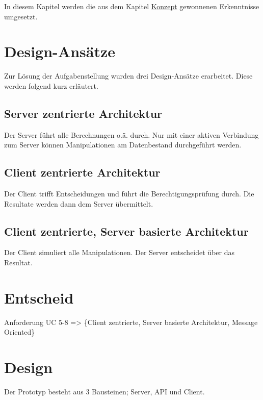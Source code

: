 \documentclass[oneside,11pt,parskip=half,ngerman]{scrreprt}
\begin{document}
In diesem Kapitel werden die aus dem Kapitel \hyperref[konzept]{Konzept}
gewonnenen Erkenntnisse umgesetzt.

\section{Design-Ansätze}\label{design-ansuxe4tze}

Zur Lösung der Aufgabenstellung wurden drei Design-Ansätze erarbeitet.
Diese werden folgend kurz erläutert.

\subsection{Server zentrierte
Architektur}\label{server-zentrierte-architektur}

Der Server führt alle Berechnungen o.ä. durch. Nur mit einer aktiven
Verbindung zum Server können Manipulationen am Datenbestand durchgeführt
werden.

\subsection{Client zentrierte
Architektur}\label{client-zentrierte-architektur}

Der Client trifft Entscheidungen und führt die Berechtigungsprüfung
durch. Die Resultate werden dann dem Server übermittelt.

\subsection{Client zentrierte, Server basierte
Architektur}\label{client-zentrierte-server-basierte-architektur}

Der Client simuliert alle Manipulationen. Der Server entscheidet über
das Resultat.

\section{Entscheid}\label{entscheid}

Anforderung UC 5-8 =\textgreater{} \{Client zentrierte, Server basierte
Architektur, Message Oriented\}

\section{Design}\label{design}

Der Prototyp besteht aus 3 Bausteinen; Server, API und Client.
\end{document}
